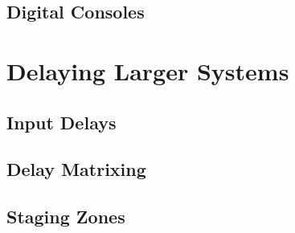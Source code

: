 \documentclass[a4paper]{article}
\begin{document}
\subsection{Digital Consoles}

\section{Delaying Larger Systems}

\subsection{Input Delays}

\subsection{Delay Matrixing}

\subsection{Staging Zones}
\end{document}
